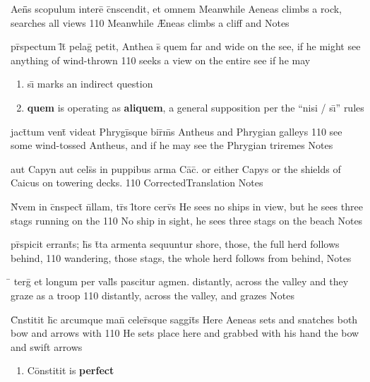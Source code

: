 \documentclass[]{book}
\begin{document}
\latline
  {Aen\={}\={}s scopulum intere\={} c\={}nscendit, et omnem}
  { Meanwhile Aeneas climbs a rock, searches all views }
  {110}
  { Meanwhile {\AE}neas climbs a cliff and  }
  { Notes }



\latline
  {pr\={}spectum l\={}t\={} pelag\={} petit, Anthea s\={\macron {\i}} quem}
  { far and wide on the see, if he might see anything of wind-thrown }
  {110}
  { seeks a view on the entire see if he may  }
  { \begin{enumerate}
  	\item s\={\i} marks an indirect question
  	\item \textbf{quem} is operating as \textbf{aliquem}, a general supposition per the ``nisi / s\={\i}'' rules
  \end{enumerate} }


\latline
  {jact\={}tum vent\={} videat Phrygi\={}sque bir\={}m\={\macron {\i}}s}
  { Antheus and Phrygian galleys }
  {110}
  { see some wind-tossed Antheus, and if he may see the Phrygian triremes }
  { Notes }


\latline
  {aut Capyn aut cels\={\macron {\i}}s in puppibus arma Ca\={\macron {\i}}c\={\macron {\i}}.}
  { or either Capys or the shields of Caicus on towering decks. }
  {110}
  { CorrectedTranslation }
  { Notes }



\latline
  {N\={}vem in c\={}nspect\={} n\={}llam, tr\={\macron {\i}}s l\={\macron {\i}}tore cerv\={}s}
  { He sees no ships in view, but he sees three stags running on the  }
  {110}
  { No ship in sight, he sees three stags on the beach }
  { Notes }


\latline
  {pr\={}spicit errant\={\macron {\i}}s; h\={}s t\={}ta armenta sequuntur}
  { shore, those, the full herd follows behind, }
  {110}
  { wandering, those stags, the whole herd follows from behind,  }
  { Notes }


\latline
  {\={} terg\={} et longum per vall\={\macron {\i}}s pascitur agmen.}
  { distantly, across the valley and they graze as a troop }
  {110}
  { distantly, across the valley, and grazes }
  { Notes }



\latline
  {C\={}nstitit h\={\macron {\i}}c arcumque man\={} celer\={\macron {\i}}sque saggit\={}s}
  { Here Aeneas sets and snatches both bow and arrows with }
  {110}
  { He sets place here and grabbed with his hand the bow and swift arrows  }
  { \begin{enumerate}
  	\item C\={o}nstitit is \textbf{perfect}
  \end{enumerate} }
\end{document}
